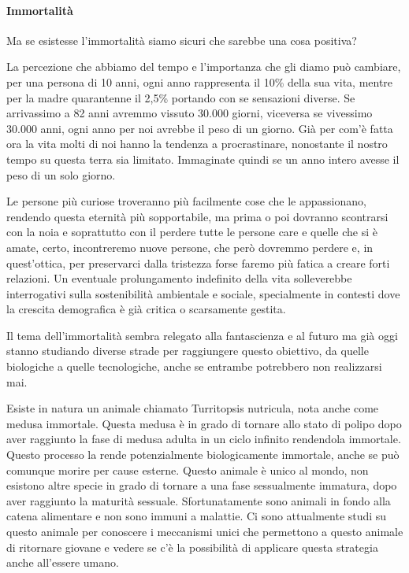 \documentclass[12pt]{book} %
\begin{document}
\paragraph{Immortalità}

Ma se esistesse l'immortalità siamo sicuri che sarebbe una cosa positiva?

La percezione che abbiamo del tempo e l'importanza che gli diamo può cambiare, per una persona
di 10 anni, ogni anno rappresenta il 10\% della sua vita, mentre per la madre quarantenne il 2,5\% portando con se
sensazioni diverse. Se arrivassimo a 82 anni avremmo vissuto 30.000 giorni, viceversa se vivessimo 30.000 anni, ogni
anno per noi avrebbe il peso di un giorno. Già per com'è fatta ora la vita molti di noi hanno la
tendenza a procrastinare, nonostante il nostro tempo su questa terra sia limitato. Immaginate quindi se un anno intero
avesse il peso di un solo giorno.

Le persone più curiose troveranno più facilmente cose che le appassionano, rendendo questa eternità più sopportabile, ma
prima o poi dovranno scontrarsi con la noia e soprattutto con il perdere tutte le persone care e quelle che si è amate,
certo, incontreremo nuove persone, che però dovremmo perdere e, in quest'ottica, per preservarci dalla tristezza forse faremo più fatica a creare forti relazioni. Un eventuale prolungamento indefinito della vita solleverebbe interrogativi sulla sostenibilità ambientale e sociale, specialmente in contesti dove la crescita demografica è già critica o scarsamente gestita.

Il tema dell'immortalità sembra relegato alla fantascienza e al futuro ma già oggi stanno studiando
diverse strade per raggiungere questo obiettivo, da quelle biologiche a quelle tecnologiche, anche se entrambe potrebbero non realizzarsi mai. 

Esiste in natura un animale chiamato Turritopsis nutricula, nota anche come medusa immortale. Questa medusa è in grado
di tornare allo stato di polipo dopo aver raggiunto la fase di medusa adulta in un ciclo infinito rendendola immortale.
Questo processo la rende potenzialmente biologicamente immortale, anche se può comunque morire per cause esterne.
Questo animale è unico al mondo, non esistono altre specie in grado di tornare a una fase sessualmente immatura, dopo
aver raggiunto la maturità sessuale. 
Sfortunatamente sono animali in fondo alla catena alimentare e non sono immuni a malattie. Ci sono attualmente studi su
questo animale per conoscere i meccanismi unici che permettono a questo animale di ritornare giovane e vedere se
c'è la possibilità di applicare questa strategia anche all'essere umano.
\end{document}
